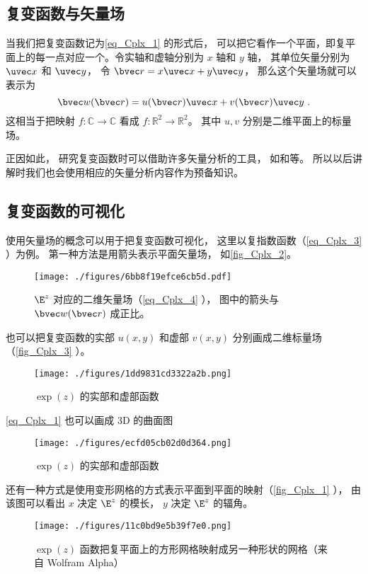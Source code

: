 \subsection{复变函数与矢量场}
当我们把复变函数记为\autoref{eq_Cplx_1} 的形式后， 可以把它看作一个平面，即复平面上的每一点对应一个。令实轴和虚轴分别为 $x$ 轴和 $y$ 轴， 其单位矢量分别为 $\uvec x$ 和 $\uvec y$， 令 $\bvec r = x \uvec x + y \uvec y$， 那么这个矢量场就可以表示为
\begin{equation}\label{eq_Cplx_4}
\bvec w(\bvec r) = u(\bvec r) \uvec x + v(\bvec r) \uvec y~.
\end{equation}
这相当于把映射 $f:\mathbb C \to \mathbb C$ 看成 $f: \mathbb R^2 \to \mathbb R^2$。 其中 $u, v$ 分别是二维平面上的标量场。

正因如此， 研究复变函数时可以借助许多矢量分析的工具， 如和等。 所以以后讲解时我们也会使用相应的矢量分析内容作为预备知识。

\subsection{复变函数的可视化}
使用矢量场的概念可以用于把复变函数可视化， 这里以复指数函数（\autoref{eq_Cplx_3} ）为例。 第一种方法是用箭头表示平面矢量场， 如\autoref{fig_Cplx_2}。
\begin{figure}[ht]
\centering
\texttt{[image: ./figures/6bb8f19efce6cb5d.pdf]}
\caption{$\E^z$ 对应的二维矢量场（\autoref{eq_Cplx_4} ）， 图中的箭头与 $\bvec w(\bvec r)$ 成正比。} \label{fig_Cplx_2}
\end{figure}
也可以把复变函数的实部 $u(x,y)$ 和虚部 $v(x, y)$ 分别画成二维标量场（\autoref{fig_Cplx_3} ）。
\begin{figure}[ht]
\centering
\texttt{[image: ./figures/1dd9831cd3322a2b.png]}
\caption{$\exp(z)$ 的实部和虚部函数} \label{fig_Cplx_3}
\end{figure}
\autoref{eq_Cplx_1} 也可以画成 3D 的曲面图
\begin{figure}[ht]
\centering
\texttt{[image: ./figures/ecfd05cb02d0d364.png]}
\caption{$\exp(z)$ 的实部和虚部函数} \label{fig_Cplx_4}
\end{figure}

还有一种方式是使用变形网格的方式表示平面到平面的映射（\autoref{fig_Cplx_1} ）， 由该图可以看出 $x$ 决定 $\E^z$ 的模长， $y$ 决定 $\E^z$ 的辐角。
\begin{figure}[ht]
\centering
\texttt{[image: ./figures/11c0bd9e5b39f7e0.png]}
\caption{$\exp(z)$ 函数把复平面上的方形网格映射成另一种形状的网格（来自 Wolfram Alpha）} \label{fig_Cplx_1}
\end{figure}

